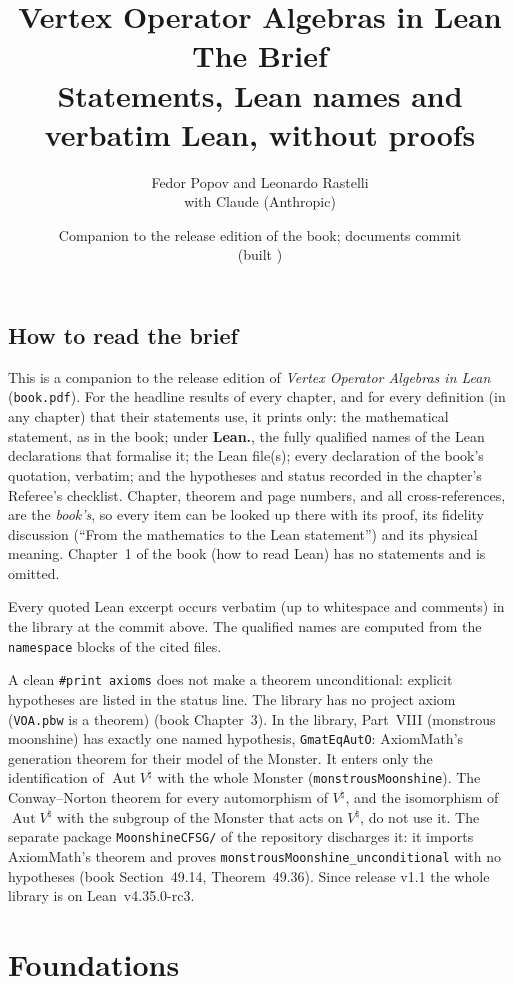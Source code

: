 \documentclass[11pt,openany]{book}
\title{\Huge Vertex Operator Algebras in Lean\\ \vspace{0.4em}\LARGE The Brief\\ \vspace{0.6em}
  \large Statements, Lean names and verbatim Lean, without proofs}
\author{Fedor Popov and Leonardo Rastelli\\ \vspace{0.3em}\small with Claude (Anthropic)}
\date{Companion to the release edition of the book; documents commit \texttt{\bookcommit}\\ \small(built \bookdate)}
\theoremstyle{definition}
\theoremstyle{plain}
\begin{document}
\frontmatter
\maketitle
\chapter*{How to read the brief}
This is a companion to the release edition of \emph{Vertex Operator Algebras in Lean}
(\texttt{book.pdf}). For the
headline results of every chapter, and for every definition (in any chapter) that their statements
use, it prints only: the mathematical statement, as in the book; under \textbf{Lean.}, the fully
qualified names of the Lean declarations that formalise it; the Lean file(s); every declaration of
the book's quotation, verbatim; and the hypotheses and status recorded in the chapter's Referee's
checklist. Chapter, theorem and page numbers, and all cross-references, are the \emph{book's}, so
every item can be looked up there with its proof, its fidelity discussion (``From the mathematics to
the Lean statement'') and its physical meaning. Chapter~1 of the book (how to read Lean) has no
statements and is omitted.

Every quoted Lean excerpt occurs verbatim (up to whitespace and comments) in the library at the
commit above. The qualified names are computed from the \texttt{namespace} blocks of the cited files.

A clean \texttt{\#print axioms} does not make a theorem unconditional: explicit hypotheses are
listed in the status line. The library has no project axiom (\texttt{VOA.pbw} is a theorem)
(book Chapter~3). In the library, Part~VIII (monstrous moonshine) has exactly one named hypothesis,
\texttt{GmatEqAutO}: AxiomMath's generation theorem for their model of the Monster. It enters only the
identification of $\operatorname{Aut}V^\natural$ with the whole Monster (\texttt{monstrousMoonshine}). The
Conway--Norton theorem for every automorphism of $V^\natural$, and the isomorphism of $\operatorname{Aut}V^\natural$
with the subgroup of the Monster that acts on $V^\natural$, do not use it. The separate package
\texttt{MoonshineCFSG/} of the repository discharges it: it imports AxiomMath's theorem and proves
\texttt{monstrousMoonshine\_unconditional} with no hypotheses (book Section~49.14, Theorem~49.36). Since release v1.1
the whole library is on Lean~v4.35.0-rc3.
\tableofcontents
\mainmatter
\pagestyle{plain}%
\part{Foundations}
\setcounter{chapter}{1}
\end{document}

